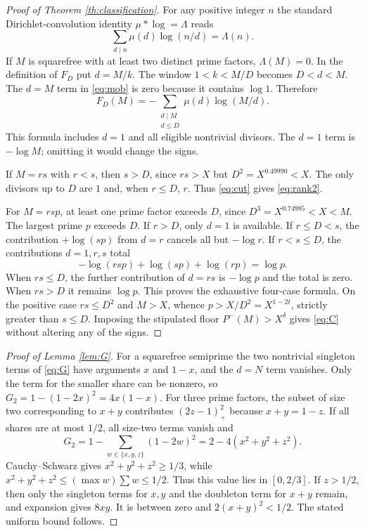 \documentclass[11pt]{article}
\newcommand{\phimin}{P^-}
\begin{document}
\begin{proof}[Proof of Theorem \ref{th:classification}]
For any positive integer $n$ the standard Dirichlet-convolution
identity $\mu*\log=\Lambda$ reads
\begin{equation}\label{eq:mob}
 \sum_{d\mid n}\mu(d)\log(n/d)=\Lambda(n).
\end{equation}
If $M$ is squarefree with at least two distinct prime factors,
$\Lambda(M)=0$.  In the definition of $F_D$ put $d=M/k$.
The window $1<k<M/D$ becomes $D<d<M$.  The $d=M$ term in
\eqref{eq:mob} is zero because it contains $\log1$.  Therefore
\begin{equation}\label{eq:cut}
 F_D(M)=-\sum_{\substack{d\mid M\\d\le D}}
                 \mu(d)\log(M/d).
\end{equation}
This formula includes $d=1$ and all eligible nontrivial divisors.
The $d=1$ term is $-\log M$; omitting it would change the signs.

If $M=rs$ with $r<s$, then $s>D$, since $rs>X$ but
$D^2=X^{0.49990}<X$.  The only divisors up to $D$ are $1$ and,
when $r\le D$, $r$.  Thus \eqref{eq:cut} gives \eqref{eq:rank2}.

For $M=rsp$, at least one prime factor exceeds $D$, since
$D^3=X^{0.74985}<X<M$.  The largest prime $p$ exceeds $D$.
If $r>D$, only $d=1$ is available.  If $r\le D<s$, the
contribution $+\log(sp)$ from $d=r$ cancels all but $-\log r$.
If $r<s\le D$, the contributions $d=1,r,s$ total
\[
 -\log(rsp)+\log(sp)+\log(rp)=\log p.
\]
When $rs\le D$, the further contribution of $d=rs$ is
$-\log p$ and the total is zero.  When $rs>D$ it remains $\log p$.
This proves the exhaustive four-case formula.
On the positive case $rs\le D^2$ and $M>X$, whence
$p>X/D^2=X^{1-2t}$, strictly greater than $s\le D$.
Imposing the stipulated floor $\phimin(M)>X^\delta$ gives
\eqref{eq:C} without altering any of the signs.
\end{proof}

\begin{proof}[Proof of Lemma \ref{lem:G}]
For a squarefree semiprime the two nontrivial singleton terms of
\eqref{eq:G} have arguments $x$ and $1-x$, and the $d=N$ term
vanishes.  Only the term for the smaller share can be nonzero,
so $G_2=1-(1-2x)^2=4x(1-x)$.
For three prime factors, the subset of size two corresponding to
$x+y$ contributes $(2z-1)_+^2$ because $x+y=1-z$.
If all shares are at most $1/2$, all size-two terms vanish and
\[
 G_2=1-\sum_{w\in\{x,y,z\}}(1-2w)^2
      =2-4(x^2+y^2+z^2).
\]
Cauchy--Schwarz gives $x^2+y^2+z^2\ge1/3$,
while $x^2+y^2+z^2\le(\max w)\sum w\le1/2$.
Thus this value lies in $[0,2/3]$.
If $z>1/2$, then only the singleton terms for $x,y$ and the
doubleton term for $x+y$ remain, and expansion gives $8xy$.
It is between zero and $2(x+y)^2<1/2$.
The stated uniform bound follows.
\end{proof}
\end{document}
